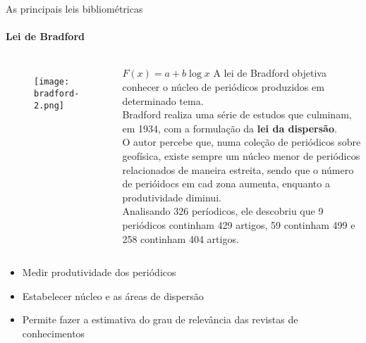 \begin{frame}[t]{As principais leis bibliométricas}
    \framesubtitle{Lei de Bradford}
       
          

    \begin{columns}

        \begin{figure}
            \texttt{[image: bradford-2.png]}
        \end{figure}

        \centering
        $F(x) = a + b \log x$
        A lei de Bradford objetiva conhecer o núcleo de periódicos produzidos em determinado tema.\\
        \scriptsize{
            Bradford realiza uma série de estudos que culminam, em 1934, com a formulação da \textbf{lei da dispersão}.\\
            O autor percebe que, numa coleção de periódicos sobre geofísica, existe sempre um núcleo menor de periódicos relacionados de maneira estreita, sendo que o número de perióidocs em cad zona aumenta, enquanto a produtividade diminui.\\
            Analisando 326 períodicos, ele descobriu que 9 periódicos continham 429 artigos, 59 continham 499 e 258 continham 404 artigos.
        }
    \end{columns}

    \vspace*{0.2cm}
    \begin{itemize}
        \item Medir produtividade dos periódicos
        \item Estabelecer núcleo e as áreas de dispersão 
        \item Permite fazer a estimativa do grau de relevância das revistas de conhecimentos
    \end{itemize}
\end{frame}
